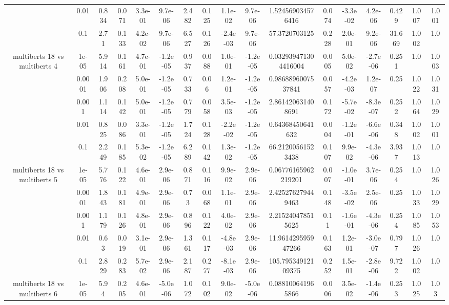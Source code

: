 \begin{tabular}{|c|c|c|c|c|c|c|c|c|c|c|c|c|c|c|c|c|}
 & 0.01 & 0.834 & 0.071 & 3.3e-01 & 9.7e-06 & 2.482 & 0.125 & 1.1e-02 & 9.7e-06 & 1.524569034576416 & 0.074 & -3.3e-02 & 4.2e-06 & 0.429 & 1.007 & 1.001 \\
 & 0.1 & 2.71 & 0.133 & 4.2e-02 & 9.7e-06 & 6.527 & 0.126 & -2.4e-03 & 9.7e-06 & 57.3720703125 & 0.228 & 2.0e-01 & 9.2e-06 & 31.669 & 1.002 & 1.0 \\
\hline
\multirow{5}{*}{multiberts 18 vs multiberts 4} & 1e-05 & 5.914 & 0.161 & 4.7e-01 & -1.2e-05 & 0.937 & 0.088 & 1.0e-01 & -1.2e-05 & 0.032939471304416004 & 0.005 & 5.0e-02 & -2.7e-06 & 0.251 & 1.0 & 1.003 \\
 & 0.0001 & 1.906 & 0.208 & 5.0e-01 & -1.2e-05 & 0.733 & 0.06 & 1.2e-01 & -1.2e-05 & 0.9868896007537841 & 0.057 & -4.2e-03 & 1.2e-07 & 0.25 & 1.022 & 1.031 \\
 & 0.001 & 1.114 & 0.142 & 5.0e-01 & -1.2e-05 & 0.779 & 0.058 & 3.5e-03 & -1.2e-05 & 2.861420631408691 & 0.172 & -5.7e-02 & -8.3e-07 & 0.252 & 1.064 & 1.029 \\
 & 0.01 & 0.825 & 0.086 & 3.3e-01 & -1.2e-05 & 1.724 & 0.128 & -2.2e-02 & -1.2e-05 & 0.64368450641632 & 0.004 & -1.2e-01 & -6.6e-06 & 0.348 & 1.002 & 1.001 \\
 & 0.1 & 2.249 & 0.185 & 5.3e-02 & -1.2e-05 & 6.289 & 0.142 & 1.3e-02 & -1.2e-05 & 66.21200561523438 & 0.107 & 9.9e-02 & -4.3e-06 & 3.937 & 1.013 & 1.0 \\
\hline
\multirow{5}{*}{multiberts 18 vs multiberts 5} & 1e-05 & 5.776 & 0.122 & 4.6e-01 & 2.9e-06 & 0.871 & 0.116 & 9.9e-02 & 2.9e-06 & 0.06776165962219201 & 0.007 & -1.0e-01 & 3.7e-06 & 0.254 & 1.0 & 1.026 \\
 & 0.0001 & 1.843 & 0.181 & 4.9e-01 & 2.9e-06 & 0.73 & 0.068 & 1.1e-01 & 2.9e-06 & 2.425276279449463 & 0.148 & -3.5e-02 & 2.5e-06 & 0.25 & 1.033 & 1.029 \\
 & 0.001 & 1.179 & 0.126 & 4.8e-01 & 2.9e-06 & 0.896 & 0.122 & 4.0e-02 & 2.9e-06 & 2.215240478515625 & 0.11 & -1.6e-01 & -4.3e-06 & 0.254 & 1.085 & 1.053 \\
 & 0.01 & 0.63 & 0.019 & 3.1e-01 & 2.9e-06 & 1.361 & 0.117 & -4.8e-03 & 2.9e-06 & 11.961429595947266 & 0.163 & 1.2e-01 & -3.0e-07 & 0.797 & 1.026 & 1.0 \\
 & 0.1 & 2.829 & 0.283 & 5.7e-02 & 2.9e-06 & 2.187 & 0.277 & -8.1e-03 & 2.9e-06 & 105.79534912109375 & 0.252 & 1.5e-01 & -2.8e-06 & 9.722 & 1.002 & 1.0 \\
\hline
\multirow{5}{*}{multiberts 18 vs multiberts 6} & 1e-05 & 5.94 & 0.205 & 4.6e-01 & -5.0e-06 & 1.072 & 0.102 & 9.0e-02 & -5.0e-06 & 0.088100641965866 & 0.006 & 3.5e-02 & -1.4e-06 & 0.253 & 1.025 & 1.03 \\

\end{tabular}
